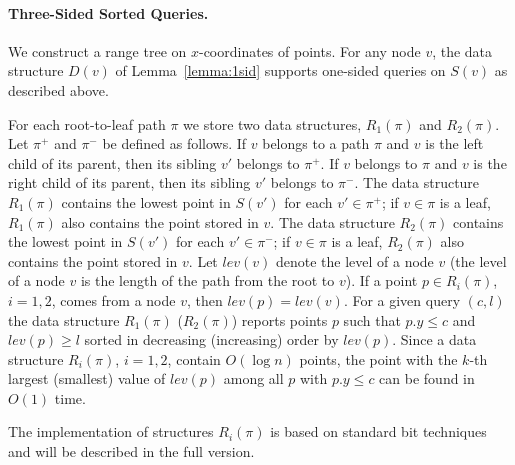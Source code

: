\documentclass[11pt]{article}
\def\ceil#1{\lceil #1 \rceil}
\newcommand{\no}[1]{}
\begin{document}
\paragraph{Three-Sided Sorted Queries.} We construct a range tree on
$x$-coordinates of points. For any node $v$, the data structure $D(v)$ of Lemma~\ref{lemma:1sid}
supports one-sided queries on $S(v)$ as described above. 
\no{We also store $\ceil{\log \log n}$ lowest points from $S(v)$ 
in a data structure $L(v)$.  Using the result of~\cite{FW94}, 
we can find for any $c$
the highest $p\in L(v)$ such that $p\le c$. 
Hence, we can use $L(v)$ to determine whether $S(v)$ contains at least 
$\log \log n$ points that are below $c$. 
If this is not the case, we can find the highest $p\in S(v)$, $p.y\le c$, 
using $L(v)$. 
}
For each
root-to-leaf path $\pi$ we store two data structures, $R_1(\pi)$ and
$R_2(\pi)$.  Let $\pi^+$ and $\pi^-$ be defined as follows. If $v$
belongs to a path $\pi$ and $v$ is the left child of its parent, then
its sibling $v'$ belongs to $\pi^+$.  If $v$ belongs to $\pi$ and $v$
is the right child of its parent, then its sibling $v'$ belongs to
$\pi^-$.  The data structure $R_1(\pi)$ contains the lowest point in
$S(v')$ for each $v'\in \pi^+$; if $v\in \pi$ is a leaf, $R_1(\pi)$
also contains the point stored in $v$.  The data structure $R_2(\pi)$
contains the lowest point in $S(v')$ for each $v'\in \pi^-$; if $v\in
\pi$ is a leaf, $R_2(\pi)$ also contains the point stored in $v$.  Let
$lev(v)$ denote the level of a node $v$ (the level of a node $v$ is the 
length of the path from the root to $v$). If a point $p\in R_i(\pi)$, $i=1,2$, comes
from a node $v$, then $lev(p)=lev(v)$.  For a given query $(c,l)$ the
data structure $R_1(\pi)$ ($R_2(\pi)$) reports points $p$ such that
$p.y\le c$ and $lev(p)\ge l$ sorted in decreasing (increasing) order
by $lev(p)$.  Since a data structure $R_i(\pi)$, $i=1,2$, contain
$O(\log n)$ points, the point with the $k$-th largest (smallest) value of $lev(p)$
among all $p$ with $p.y\le c$ can be found in $O(1)$ time. 
\no{first $k$ points can be found in $O(k)$ time.}
The implementation of structures $R_i(\pi)$ is based on standard bit 
techniques and will be described in the full version.
\end{document}
